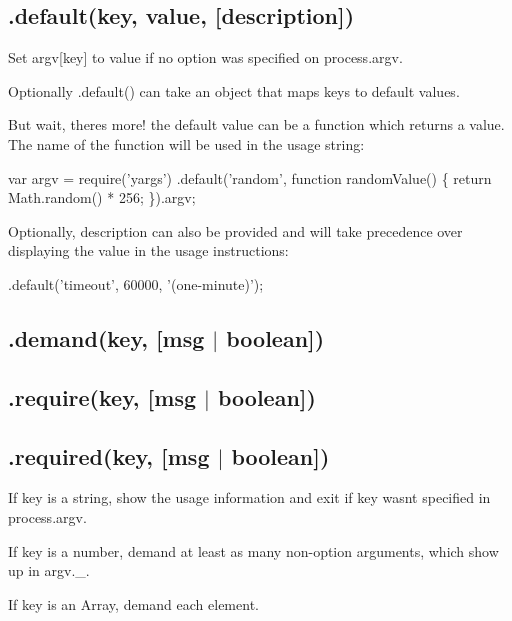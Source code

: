 \subsection*{.default(key, value, \mbox{[}description\mbox{]}) }

Set {\ttfamily argv\mbox{[}key\mbox{]}} to {\ttfamily value} if no option was specified on {\ttfamily process.\+argv}.

Optionally {\ttfamily .default()} can take an object that maps keys to default values.

But wait, there\textquotesingle{}s more! the default value can be a {\ttfamily function} which returns a value. The name of the function will be used in the usage string\+:


\begin{DoxyCode}
var argv = require('yargs')
  .default('random', function randomValue() \{
    return Math.random() * 256;
  \}).argv;
\end{DoxyCode}


Optionally, {\ttfamily description} can also be provided and will take precedence over displaying the value in the usage instructions\+:


\begin{DoxyCode}
.default('timeout', 60000, '(one-minute)');
\end{DoxyCode}


\subsection*{.demand(key, \mbox{[}msg $\vert$ boolean\mbox{]}) }

\subsection*{.require(key, \mbox{[}msg $\vert$ boolean\mbox{]}) }

\subsection*{.required(key, \mbox{[}msg $\vert$ boolean\mbox{]}) }

If {\ttfamily key} is a string, show the usage information and exit if {\ttfamily key} wasn\textquotesingle{}t specified in {\ttfamily process.\+argv}.

If {\ttfamily key} is a number, demand at least as many non-\/option arguments, which show up in {\ttfamily argv.\+\_\+}.

If {\ttfamily key} is an Array, demand each element.

